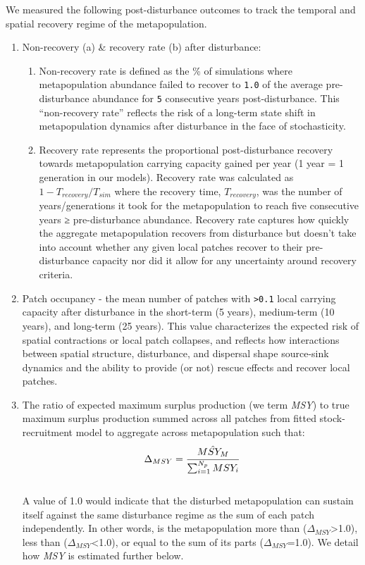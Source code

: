 \documentclass[
]{article}
\providecommand{\tightlist}{%
  \setlength{\itemsep}{0pt}\setlength{\parskip}{0pt}}
\begin{document}
We measured the following post-disturbance outcomes to track the
temporal and spatial recovery regime of the metapopulation.

\begin{enumerate}
\def\labelenumi{\arabic{enumi}.}
\item
  Non-recovery (a) \& recovery rate (b) after disturbance:

  \begin{enumerate}
  \def\labelenumii{\alph{enumii}.}
  \tightlist
  \item
    Non-recovery rate is defined as the \% of simulations where
    metapopulation abundance failed to recover to \texttt{1.0} of the
    average pre-disturbance abundance for \texttt{5} consecutive years
    post-disturbance. This ``non-recovery rate'' reflects the risk of a
    long-term state shift in metapopulation dynamics after disturbance
    in the face of stochasticity.
  \item
    Recovery rate represents the proportional post-disturbance recovery
    towards metapopulation carrying capacity gained per year (1 year = 1
    generation in our models). Recovery rate was calculated as
    \(1-T_{recovery}/T_{sim}\) where the recovery time,
    \(T_{recovery}\), was the number of years/generations it took for
    the metapopulation to reach five consecutive years ≥ pre-disturbance
    abundance. Recovery rate captures how quickly the aggregate
    metapopulation recovers from disturbance but doesn't take into
    account whether any given local patches recover to their
    pre-disturbance capacity nor did it allow for any uncertainty around
    recovery criteria.
  \end{enumerate}
\item
  Patch occupancy - the mean number of patches with
  \texttt{\textgreater{}0.1} local carrying capacity after disturbance
  in the short-term (5 years), medium-term (10 years), and long-term (25
  years). This value characterizes the expected risk of spatial
  contractions or local patch collapses, and reflects how interactions
  between spatial structure, disturbance, and dispersal shape
  source-sink dynamics and the ability to provide (or not) rescue
  effects and recover local patches.
\item
  The ratio of expected maximum surplus production (we term \emph{MSY})
  to true maximum surplus production summed across all patches from
  fitted stock-recruitment model to aggregate across metapopulation such
  that:\\
  \begin{align}
  \Delta_{MSY}=\cfrac{\hat{MSY_M}}{\sum_{i=1}^{N_p} MSY_{i}}
  \end{align}\\
  A value of 1.0 would indicate that the disturbed metapopulation can
  sustain itself against the same disturbance regime as the sum of each
  patch independently. In other words, is the metapopulation more than
  (\(\Delta_{MSY}\)\textgreater1.0), less than
  (\(\Delta_{MSY}\)\textless1.0), or equal to the sum of its parts
  (\(\Delta_{MSY}\)=1.0). We detail how \emph{MSY} is estimated further
  below.
\end{enumerate}
\end{document}
